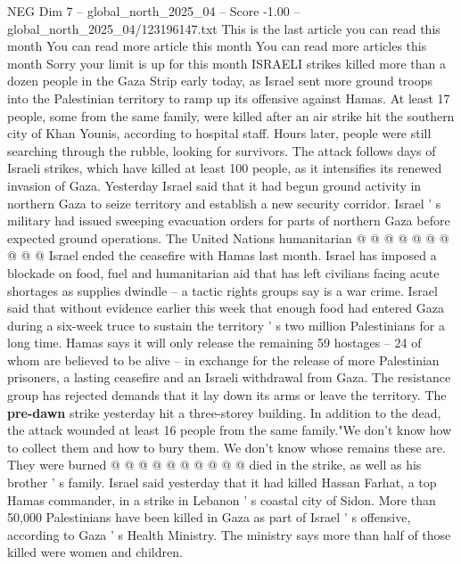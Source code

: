 \begin{textsample}{NEG Dim 7 – global\_north\_2025\_04 – Score -1.00 – global\_north\_2025\_04/123196147.txt}  \label{ex:f7_neg_095}
This is the last article you can read this month You can read more article this month You can read more articles this month Sorry your limit is up for this month ISRAELI strikes killed more than a dozen people in the Gaza Strip early today, as Israel sent more ground troops into the Palestinian territory to ramp up its offensive against Hamas.
At least 17 people, some from the same family, were killed after an air strike hit the southern city of Khan Younis, according to hospital staff.
Hours later, people were still searching through the rubble, looking for survivors.
The attack follows days of Israeli strikes, which have killed at least 100 people, as it intensifies its renewed invasion of Gaza.
Yesterday Israel said that it had begun ground activity in northern Gaza to seize territory and establish a new security corridor.
Israel ' s military had issued sweeping evacuation orders for parts of northern Gaza before expected ground operations.
The United Nations humanitarian @ @ @ @ @ @ @ @ @ @ Israel ended the ceasefire with Hamas last month.
Israel has imposed a blockade on food, fuel and humanitarian aid that has left civilians facing acute shortages as supplies dwindle -- a tactic rights groups say is a war crime.
Israel said that without evidence earlier this week that enough food had entered Gaza during a six-week truce to sustain the territory ' s two million Palestinians for a long time.
Hamas says it will only release the remaining 59 hostages -- 24 of whom are believed to be alive -- in exchange for the release of more Palestinian prisoners, a lasting ceasefire and an Israeli withdrawal from Gaza.
The resistance group has rejected demands that it lay down its arms or leave the territory.
The \textbf{pre-dawn} strike yesterday hit a three-storey building.
In addition to the dead, the attack wounded at least 16 people from the same family."We don't know how to collect them and how to bury them.
We don't know whose remains these are.
They were burned @ @ @ @ @ @ @ @ @ @ died in the strike, as well as his brother ' s family.
Israel said yesterday that it had killed Hassan Farhat, a top Hamas commander, in a strike in Lebanon ' s coastal city of Sidon.
More than 50,000 Palestinians have been killed in Gaza as part of Israel ' s offensive, according to Gaza ' s Health Ministry.
The ministry says more than half of those killed were women and children.

\end{textsample}
